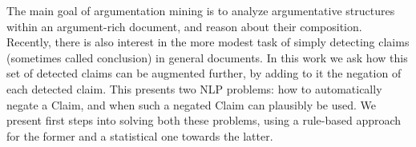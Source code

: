 The main goal of argumentation mining is to analyze argumentative structures within an argument-rich document, and reason about their composition. Recently, there is also interest in the more modest task of simply detecting claims (sometimes called conclusion) in general documents. In this work we ask how this set of detected claims can be augmented further, by adding to it the negation of each detected claim. This presents two NLP problems: how to automatically negate a Claim, and when such a negated Claim can plausibly be used. We present first steps into solving both these problems, using a rule-based approach for the former and a statistical one towards the latter.
